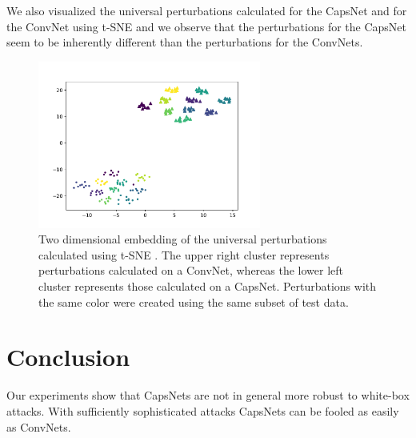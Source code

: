 \documentclass{article}
\begin{document}
We also visualized the universal perturbations calculated for the CapsNet and for the ConvNet using t-SNE \cite{tsne} and we observe that the perturbations for the CapsNet seem to be inherently different than the perturbations for the ConvNets.
\begin{figure}[h]
	\centering
	\includegraphics[height=5.5cm]{figures/tsne.pdf}
	\caption{Two dimensional embedding of the universal perturbations calculated using t-SNE \cite{tsne}. The upper right cluster represents perturbations calculated on a ConvNet, whereas the lower left cluster represents those calculated on a CapsNet. Perturbations with the same color were created using the same subset of test data.}
\end{figure}


\FloatBarrier
\section{Conclusion}
Our experiments show that CapsNets are not in general more robust to white-box attacks. With sufficiently sophisticated attacks CapsNets can be fooled as easily as ConvNets. 





\end{document}
